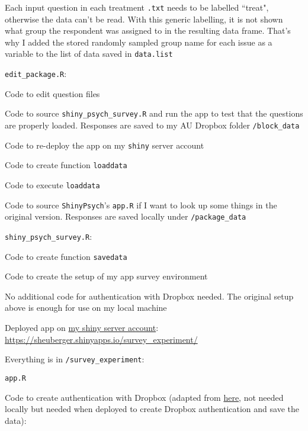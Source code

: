 \documentclass[12pt]{article}
\begin{document}
\begin{coi}
\begin{coi}
				\item Each input question in each treatment {\tt .txt} needs to be labelled ``treat", otherwise the data can't be read. With this generic labelling, it is not shown what group the respondent was assigned to in the resulting data frame. That's why I added the stored randomly sampled group name for each issue as a variable to the list of data saved in {\tt data.list} 
			\end{coi}
		\item {\tt edit\_package.R}:
			\begin{coi}
				\item Code to edit question files
				\item Code to source {\tt shiny\_psych\_survey.R} and run the app to test that the questions are properly loaded. Responses are saved to my AU Dropbox folder {\tt /block\_data}
				\item Code to re-deploy the app on my {\tt shiny} server account
				\item Code to create function {\tt loaddata}
				\item Code to execute {\tt loaddata}
				\item Code to source {\tt ShinyPsych}'s {\tt app.R} if I want to look up some things in the original version. Responses are saved locally under {\tt /package\_data}
			\end{coi}
		\item {\tt shiny\_psych\_survey.R}:
			\begin{coi}
				\item Code to create function {\tt savedata}
				\item Code to create the setup of my app survey environment
				\item No additional code for authentication with Dropbox needed. The original setup above is enough for use on my local machine 
			\end{coi}
		\item Deployed app on \href{https://www.shinyapps.io/admin/#/login}{my shiny server account}: \href{https://sheuberger.shinyapps.io/survey_experiment/}{https://sheuberger.shinyapps.io/survey\_experiment/}
			\begin{coi}
				\item Everything is in {\tt /survey\_experiment}:
					\begin{coi}
						\item {\tt app.R}
							\begin{coi}
								\item Code to create authentication with Dropbox (adapted from \href{https://github.com/karthik/rdrop2}{here}, not needed locally but needed when deployed to create Dropbox authentication and save the data):

\end{coi}
\end{coi}
\end{coi}
\end{coi}
\end{document}
